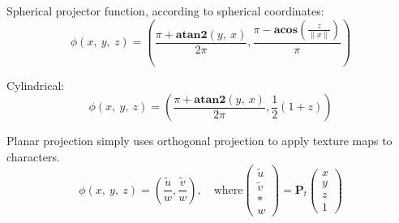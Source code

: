 \documentclass[10pt, a4paper]{article}
\begin{document}
                Spherical projector function, according to spherical coordinates: 
                $$\phi(x,\ y,\ z) = (\frac{\pi + \textbf{atan2}(y,\ x)}{2\pi}, \frac{\pi - \textbf{acos}(\frac{z}{\parallel x \parallel})}{\pi})$$

                Cylindrical:
                $$\phi(x,\ y,\ z) = (\frac{\pi + \textbf{atan2}(y,\ x)}{2\pi}, \frac{1}{2}(1 + z))$$
                
                Planar projection simply uses orthogonal projection to apply texture maps to characters.
                \begin{equation*}
                    \phi(x,\ y,\ z) = (\frac{\tilde{u}}{w}, \frac{\tilde{v}}{w}), \quad \text{where}
                    \begin{pmatrix}
                        \tilde{u} \\
                        \tilde{v} \\
                        * \\
                        w 
                    \end{pmatrix}
                    = \textbf{P}_t
                    \begin{pmatrix}
                        x \\
                        y \\
                        z \\
                        1
                    \end{pmatrix}
                \end{equation*}
\end{document}
